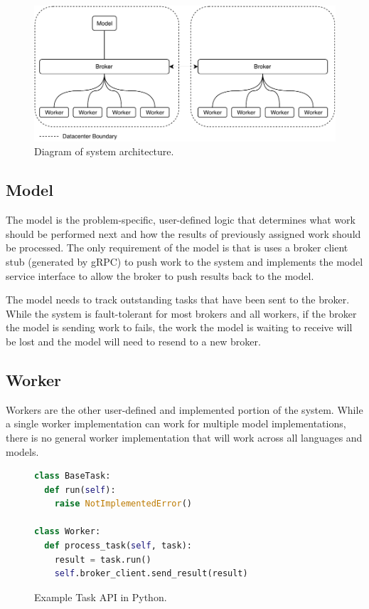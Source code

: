\documentclass[conference]{IEEEtran}
\begin{document}
\begin{figure}
  \centering
  \includegraphics{img/broker-arch.pdf}
  \caption{Diagram of system architecture.}
  \label{fig:sys-arch}
\end{figure}

\subsection{Model}
The model is the problem-specific, user-defined logic that determines what work
should be performed next and how the results of previously assigned work should
be processed. The only requirement of the model is that is uses a broker client
stub (generated by gRPC) to push work to the system and implements the model
service interface to allow the broker to push results back to the model.

The model needs to track outstanding tasks that have been sent to the broker.
While the system is fault-tolerant for most brokers and all workers, if the
broker the model is sending work to fails, the work the model is waiting to
receive will be lost and the model will need to resend to a new broker.

\subsection{Worker}
Workers are the other user-defined and implemented portion of the system. While
a single worker implementation can work for multiple model implementations, there
is no general worker implementation that will work across all languages and models.

\begin{figure}
  \begin{lstlisting}[language=python]
class BaseTask:
  def run(self):
    raise NotImplementedError()

class Worker:
  def process_task(self, task):
    result = task.run()
    self.broker_client.send_result(result)
  \end{lstlisting}
  \caption{Example Task API in Python.}\label{fig:python-api}
\end{figure}
\end{document}
